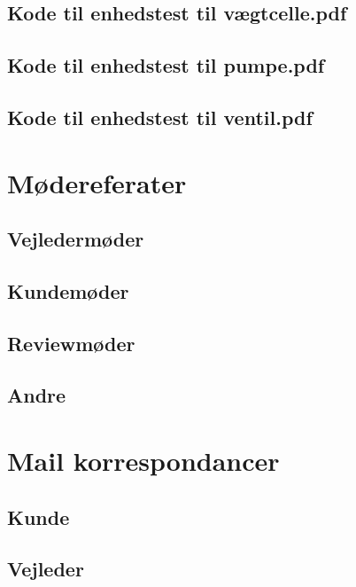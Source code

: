 \subsection{Kode til enhedstest til vægtcelle.pdf} 
\label{bilag:TKloadcell}

\subsection{Kode til enhedstest til pumpe.pdf}
\label{bilag:TKpumpe}

\subsection{Kode til enhedstest til ventil.pdf}
\label{bilag:TKventil}

\section{Mødereferater}
\label{mode}

\subsection{Vejledermøder}
\label{modevejleder}

\subsection{Kundemøder}
\label{modekunde}

\subsection{Reviewmøder}
\label{moderefreview}

\subsection{Andre}
\label{moderefAndre}

\section{Mail korrespondancer}
\label{mails}

\subsection{Kunde}
\label{mailKunde}

\subsection{Vejleder}
\label{mailvejleder}

